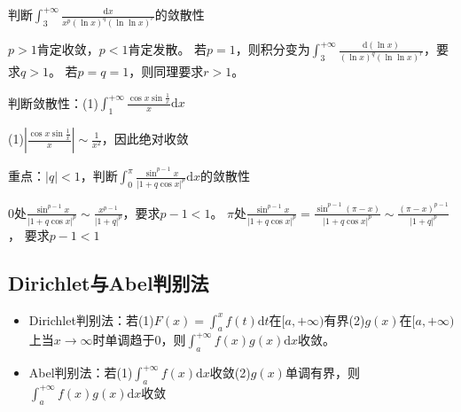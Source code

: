 \begin{exercise}[对数比较判别进阶]
  判断$\int_3^{+\infty}\frac{\mathrm{d}x}{x^p (\ln x)^q (\ln \ln x)^r}$的敛散性
\end{exercise}

\begin{solution}
  $p > 1$肯定收敛，$p < 1$肯定发散。
  若$p = 1$，则积分变为$\int_3^{+\infty} \frac{\mathrm{d}(\ln x)}{(\ln x)^q (\ln \ln x)^r}$，要求$q > 1$。
  若$p = q = 1$，则同理要求$r > 1$。
\end{solution}

\begin{exercise}
  判断敛散性：(1)$\int_1^{+\infty}\frac{\cos x \sin \frac{1}{x}}{x}\mathrm{d}x$
\end{exercise}

\begin{solution}
  (1)$|\frac{\cos x \sin \frac{1}{x}}{x}| \sim \frac{1}{x^2}$，因此绝对收敛
\end{solution}

\begin{exercise}[三角双瑕点训练]
  重点：$|q| < 1$，判断$\int _0^{\pi}\frac{\sin^{p-1}x}{|1 + q \cos x|^p}\mathrm{d}x$的敛散性
\end{exercise}

\begin{solution}
  $0$处$\frac{\sin^{p-1}x}{|1 + q \cos x|^p} \sim \frac{x^{p-1}}{|1 + q|^p}$，要求$p - 1<1$。
  $\pi$处$\frac{\sin^{p-1}x}{|1 + q \cos x|^p} = \frac{\sin^{p-1}(\pi - x)}{|1 + q\cos x|^p} \sim \frac{(\pi - x)^{p-1}}{|1 + q|^p}$，
  要求$p - 1 < 1$
\end{solution}

\subsection{Dirichlet与Abel判别法}

\begin{theorem}[Dirichlet与Abel判别法]
  \begin{itemize}
  \item Dirichlet判别法：若(1)$F(x) = \int_a^x f(t)\mathrm{d}t$在$[a,+\infty)$有界(2)$g(x)$在$[a,+\infty)$上当$x \rightarrow \infty$时单调趋于$0$，则$\int_a^{+\infty}f(x)g(x)\mathrm{d}x$收敛。
  \item Abel判别法：若(1)$\int_a^{+\infty}f(x)\mathrm{d}x$收敛(2)$g(x)$单调有界，则$\int_a^{+\infty}f(x)g(x)\mathrm{d}x$收敛
  \end{itemize}
\end{theorem}


